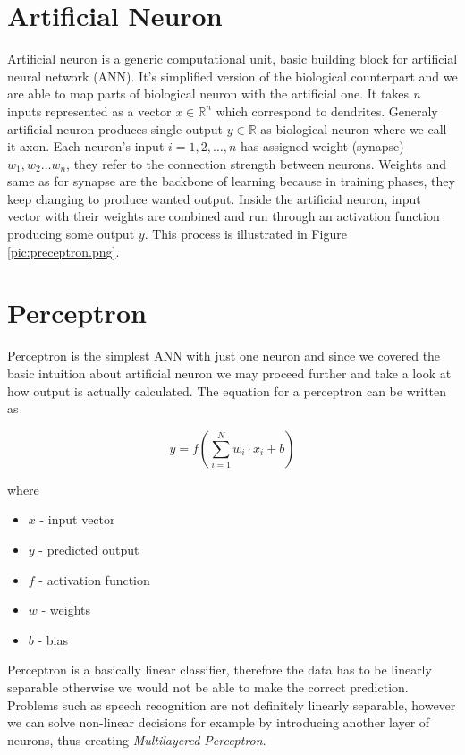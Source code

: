 \section{Artificial Neuron}

Artificial neuron is a generic computational unit, basic building block for artificial neural network (ANN).
It's simplified version of the biological counterpart and we are able to map parts of biological neuron with the artificial one.
It takes \textit{n} inputs represented as a vector $x\in\mathbb{R}^n$ which correspond to dendrites.
Generaly artificial neuron produces single output $y\in\mathbb{R}$ as biological neuron where we call it axon.
Each neuron's input $i=1,2,\ldots, n$ has assigned weight (synapse) $w_1, w_2 \ldots w_n$, they refer to the connection strength between neurons.
Weights and same as for synapse are the backbone of learning because in training phases, they keep changing to produce wanted output.
Inside the artificial neuron, input vector with their weights are combined and run through an activation function producing some output $y$.
This process is illustrated in Figure \ref{pic:preceptron.png}.


\section{Perceptron}

Perceptron is the simplest ANN with just one neuron and since we covered the basic intuition about artificial neuron we may proceed further and take a look at how output is actually calculated.
The equation for a perceptron can be written as

\begin{equation} \label{eq:1}
 y = f(\sum_{i=1}^N w_i \cdot x_i + b)
\end{equation}

where

\begin{itemize}
	\item $x$ - input vector
	\item $y$ - predicted output
  \item $f$ - activation function
	\item $w$ - weights
	\item $b$ - bias
\end{itemize}

Perceptron is a basically linear classifier, therefore the data has to be linearly separable otherwise we would not be able to make the correct prediction.
Problems such as speech recognition are not definitely linearly separable, however we can solve non-linear decisions for example by introducing another layer of neurons, thus creating \textit{Multilayered Perceptron}.

